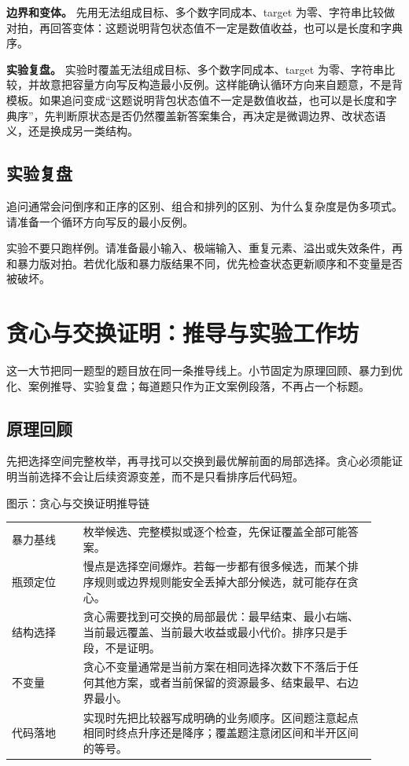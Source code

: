 \textbf{边界和变体。} 先用无法组成目标、多个数字同成本、target 为零、字符串比较做对拍，再回答变体：这题说明背包状态值不一定是数值收益，也可以是长度和字典序。

\textbf{实验复盘。} 实验时覆盖无法组成目标、多个数字同成本、target 为零、字符串比较，并故意把容量方向写反构造最小反例。这样能确认循环方向来自题意，不是背模板。如果追问变成“这题说明背包状态值不一定是数值收益，也可以是长度和字典序”，先判断原状态是否仍然覆盖新答案集合，再决定是微调边界、改状态语义，还是换成另一类结构。

\subsection{实验复盘}

追问通常会问倒序和正序的区别、组合和排列的区别、为什么复杂度是伪多项式。请准备一个循环方向写反的最小反例。

实验不要只跑样例。请准备最小输入、极端输入、重复元素、溢出或失效条件，再和暴力版对拍。若优化版和暴力版结果不同，优先检查状态更新顺序和不变量是否被破坏。

\section{贪心与交换证明：推导与实验工作坊}
这一大节把同一题型的题目放在同一条推导线上。小节固定为原理回顾、暴力到优化、案例推导、实验复盘；每道题只作为正文案例段落，不再占一个标题。

\subsection{原理回顾}

先把选择空间完整枚举，再寻找可以交换到最优解前面的局部选择。贪心必须能证明当前选择不会让后续资源变差，而不是只看排序后代码短。

\begin{principlebox}{图示：贪心与交换证明推导链}
\begin{tabular}{@{}p{0.18\linewidth}p{0.74\linewidth}@{}}
暴力基线 & 枚举候选、完整模拟或逐个检查，先保证覆盖全部可能答案。\\
瓶颈定位 & 慢点是选择空间爆炸。若每一步都有很多候选，而某个排序规则或边界规则能安全丢掉大部分候选，就可能存在贪心。\\
结构选择 & 贪心需要找到可交换的局部最优：最早结束、最小右端、当前最远覆盖、当前最大收益或最小代价。排序只是手段，不是证明。\\
不变量 & 贪心不变量通常是当前方案在相同选择次数下不落后于任何其他方案，或者当前保留的资源最多、结束最早、右边界最小。\\
代码落地 & 实现时先把比较器写成明确的业务顺序。区间题注意起点相同时终点升序还是降序；覆盖题注意闭区间和半开区间的等号。\\
\end{tabular}
\end{principlebox}

